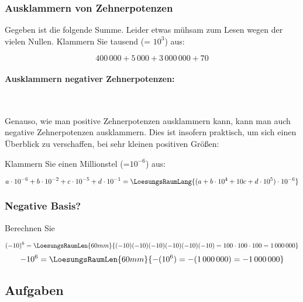 \subsubsection{Ausklammern von Zehnerpotenzen}
Gegeben ist die folgende Summe. Leider etwas mühsam zum Lesen wegen der vielen Nullen. Klammern Sie tausend (= $10^3$) aus:

$$400\,000 + 5\,000 + 3\,000\,000 + 70$$


\paragraph{Ausklammern negativer Zehnerpotenzen:}
\,

\vspace{1mm}

Genauso, wie man positive Zehnerpotenzen ausklammern kann, kann man auch negative Zehnerpotenzen ausklammern. Dies ist insofern praktisch, um sich einen Überblick zu verschaffen, bei sehr kleinen positiven Größen:

Klammern Sie einen Millionstel (=$10^{-6}$) aus:


$$a\cdot{}10^{-6} + b\cdot{}10^{-2} + c\cdot{}10^{-5} +
d\cdot{}10^{-1} = \LoesungsRaumLang{(a + b\cdot{}10^4 + 10c + d\cdot{}10^{5}) \cdot{} 10^{-6}}$$

\subsubsection{Negative Basis?}

Berechnen Sie

$$(-10)^6 = \LoesungsRaumLen{60mm}{ (-10)(-10)(-10)(-10)(-10)(-10) = 100 \cdot{} 100 \cdot{} 100 = 1\,000\,000 }$$
$$-10^6   = \LoesungsRaumLen{60mm}{ -(10^6) = - (1\,000\,000) = -1\,000\,000 }$$

\subsection*{Aufgaben}





\newpage
